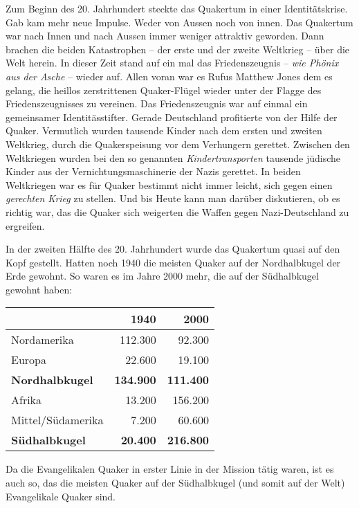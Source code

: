 Zum Beginn des 20. Jahrhundert steckte das Quakertum in einer Identitätskrise.
Gab kam mehr neue Impulse. Weder von Aussen noch von innen. Das Quakertum war
nach Innen und nach Aussen immer weniger attraktiv geworden. Dann brachen die
beiden Katastrophen -- der erste und der zweite Weltkrieg -- über die Welt
herein. In dieser Zeit stand auf ein mal das Friedenszeugnis -- \textit{wie
Phönix aus der Asche} -- wieder auf. Allen voran war es Rufus Matthew Jones dem
es gelang, die heillos zerstrittenen Quaker-Flügel wieder unter der Flagge des
Friedenszeugnisses zu vereinen. Das Friedenszeugnis war auf einmal ein
gemeinsamer Identitässtifter. Gerade Deutschland profitierte von der Hilfe der
Quaker. Vermutlich wurden tausende Kinder nach dem ersten und zweiten Weltkrieg,
durch die Quakerspeisung vor dem Verhungern gerettet. Zwischen den Weltkriegen
wurden bei den so genannten \textit{Kindertransporten} tausende jüdische Kinder
aus der Vernichtungsmaschinerie der Nazis gerettet. In beiden Weltkriegen war es
für Quaker bestimmt nicht immer leicht, sich gegen einen \textit{gerechten
Krieg} zu stellen. Und bis Heute kann man darüber diskutieren, ob es richtig
war, das die Quaker sich weigerten die Waffen gegen Nazi-Deutschland zu
ergreifen.

\medskip

In der zweiten Hälfte des 20. Jahrhundert wurde das Quakertum quasi auf den Kopf
gestellt. Hatten noch 1940 die meisten Quaker auf der Nordhalbkugel der Erde
gewohnt. So waren es im Jahre 2000 mehr, die auf der Südhalbkugel gewohnt haben:

\begin{center}
\label{ref:tab_wortersetzungen}
\begin{tabular}{|l|r|r|} \hline
                        & \textbf{1940}        & \textbf{2000}    \\ \hline
\hline
Nordamerika             & 112.300              & 92.300           \\ \hline
Europa                  & 22.600               & 19.100           \\ \hline
\textbf{Nordhalbkugel}  & \textbf{134.900}     & \textbf{111.400} \\ \hline
Afrika                  & 13.200               & 156.200          \\ \hline
Mittel/Südamerika       & 7.200                & 60.600           \\ \hline
\textbf{Südhalbkugel}   & \textbf{20.400}      & \textbf{216.800} \\ \hline
\end{tabular}
\end{center}


Da die Evangelikalen Quaker in erster Linie in der Mission tätig waren, ist es
auch so, das die meisten Quaker auf der Südhalbkugel (und somit auf der Welt)
Evangelikale Quaker sind.